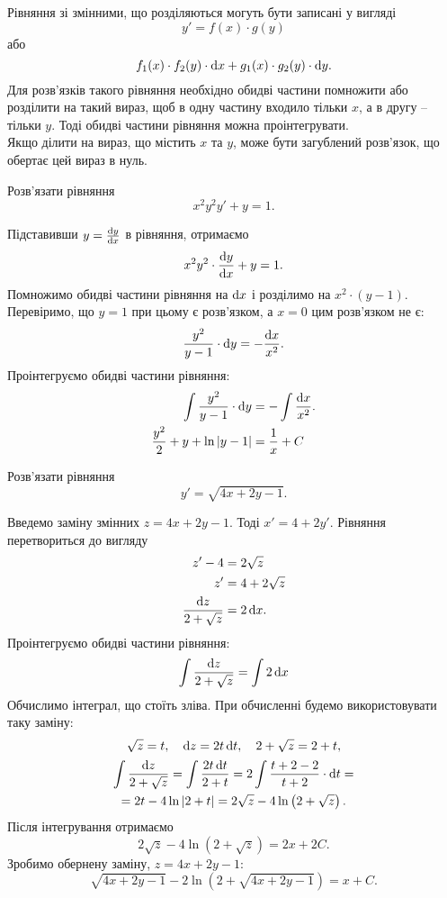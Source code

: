 Рівняння зі змінними, що розділяються могуть бути записані у вигляді \[y' = f(x) \cdot g(y)\] або \[f_1(x) \cdot f_2(y) \cdot \mathop{}\!\mathrm{d} x + g_1(x) \cdot g_2(y) \cdot \mathop{}\!\mathrm{d} y.\] Для розв'язків такого рівняння необхідно обидві частини помножити або розділити на такий вираз, щоб в одну частину входило тільки $x$, а в другу -- тільки $y$. Тоді обидві частини рівняння можна проінтегрувати. \\

Якщо ділити на вираз, що містить $x$ та $y$, може бути загублений роз\-в'яз\-ок, що обертає цей вираз в нуль.

\begin{example}
	Розв'язати рівняння \[x^2 y^2 y' + y = 1.\]
\end{example}

\begin{solution}
	Підставивши $y = \frac{\mathop{}\!\mathrm{d} y}{\mathop{}\!\mathrm{d} x}$ в рівняння, отримаємо \[ x^2 y^2 \cdot \frac{\mathop{}\!\mathrm{d} y}{\mathop{}\!\mathrm{d} x} + y = 1.\] Помножимо обидві частини рівняння на $\mathop{}\!\mathrm{d} x$ і розділимо на $x^2 \cdot (y - 1)$. Перевіримо, що $y = 1$ при цьому є роз\-в'яз\-ком, а $x = 0$ цим роз\-в'яз\-ком не є: \[ \frac{y^2}{y - 1} \cdot \mathop{}\!\mathrm{d} y = - \frac{\mathop{}\!\mathrm{d} x}{x^2}. \] Проінтегруємо обидві частини рівняння:
	\begin{align*}
		\int \frac{y^2}{y - 1} \cdot \mathop{}\!\mathrm{d} y &= - \int \frac{\mathop{}\!\mathrm{d} x}{x^2}. \\
		\frac{y^2}{2} + y + \ln |y - 1| &= \frac{1}{x} + C
	\end{align*}
\end{solution}

\begin{example}
	Розв'язати рівняння \[ y' = \sqrt{4x + 2y - 1}.\] 
\end{example}

\begin{solution}
	Введемо заміну змінних $z = 4 x + 2 y - 1$. Тоді $x' = 4 + 2 y'$. Рівняння перетвориться до вигляду \begin{align*} z' - 4 &= 2 \sqrt{z} \\ z' &= 4 + 2 \sqrt{z} \\ \frac{\mathop{}\!\mathrm{d} z}{2 + \sqrt{z}} &= 2 \mathop{}\!\mathrm{d} x.\end{align*} Проінтегруємо обидві частини рівняння: \[ \int \frac{\mathop{}\!\mathrm{d} z}{2 + \sqrt{z}} = \int 2 \mathop{}\!\mathrm{d} x \] Обчислимо інтеграл, що стоїть зліва. При обчисленні будемо використовувати таку заміну: \[ \sqrt{z} = t, \quad \mathop{}\!\mathrm{d} z = 2 t \mathop{}\!\mathrm{d} t, \quad 2 + \sqrt{z} = 2 + t, \]
	\begin{multline*}
		\int \frac{\mathop{}\!\mathrm{d} z}{2 + \sqrt{z}} = \int \frac{2 t \mathop{}\!\mathrm{d} t}{2 + t} = 2 \int \frac{t + 2 - 2}{t + 2} \cdot \mathop{}\!\mathrm{d} t = \\
		= 2 t - 4 \ln |2 + t| = 2 \sqrt{z} - 4 \ln \left(2 + \sqrt{z}\right).
	\end{multline*}
	Після інтегрування отримаємо \[2 \sqrt{z} - 4 \ln \left(2 + \sqrt{z}\right) = 2 x + 2 C.\] Зробимо обернену заміну, $z = 4x + 2y - 1$: \[ \sqrt{4x + 2y - 1} - 2 \ln \left(2 + \sqrt{4x + 2y - 1}\right) = x + C.\]
\end{solution}

